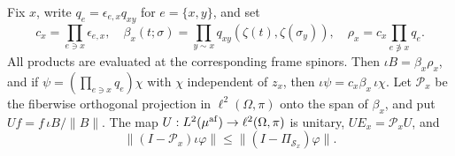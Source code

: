 \begin{lemma}\label{l:quantumfibre}
Fix \(x\), write \(q_e=\epsilon_{e,x}q_{xy}\) for \(e=\{x,y\}\),
and set
\[
 c_x=\prod_{e\ni x}\epsilon_{e,x},\quad
 \beta_x(t;\sigma)=\prod_{y\sim x}q_{xy}(\zeta(t),\zeta(\sigma_y)),
 \quad \rho_x=c_x\prod_{e\not\ni x}q_e .
\]
All products are evaluated at the corresponding frame spinors.
Then \(\iota B=\beta_x\rho_x\), and if
\(\psi=(\prod_{e\ni x}q_e)\chi\) with \(\chi\) independent of \(z_x\),
then \(\iota\psi=c_x\beta_x\,\iota\chi\).
Let \(\mathcal P_x\) be the fiberwise orthogonal projection in
\(\ell^2(\Omega,\pi)\) onto the span of \(\beta_x\), and put
\(Uf=f\,\iota B/\|B\|\).
The map \(U:L^2(\mu^{\rm af})\to\ell^2(\Omega,\pi)\) is unitary,
\(UE_x=\mathcal P_xU\), and
\[
 \|(I-\mathcal P_x)\iota\varphi\|
            \le\|(I-\Pi_{\mathcal S_x})\varphi\|.
\]
\end{lemma}

